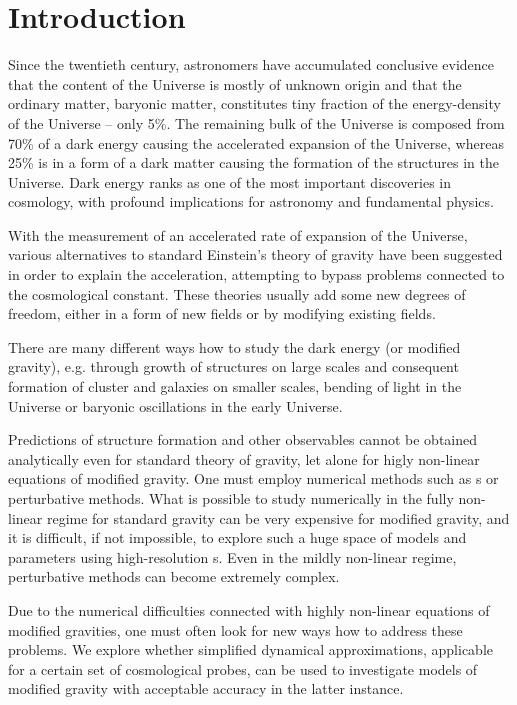 \chapter*{Introduction}
Since the twentieth century, astronomers have accumulated conclusive evidence that the content of the Universe is mostly of unknown origin and that the ordinary matter, baryonic matter, constitutes tiny fraction of the energy-density of the Universe -- only 5\%. The remaining bulk of the Universe is composed from 70\% of a dark energy causing the accelerated expansion of the Universe, whereas 25\% is in a form of a dark matter causing the formation of the structures in the Universe. Dark energy ranks as one of the most important discoveries in cosmology, with profound implications for astronomy and fundamental physics.

With the measurement of an accelerated rate of expansion of the Universe, various alternatives to standard Einstein's theory of gravity have been suggested in order to explain the acceleration, attempting to bypass problems connected to the cosmological constant. These theories usually add some new degrees of freedom, either in a form of new fields or by modifying existing fields.

There are many different ways how to study the dark energy (or modified gravity), e.g. through growth of structures on large scales and consequent formation of cluster and galaxies on smaller scales, bending of light in the Universe or baryonic oscillations in the early Universe.

Predictions of structure formation and other observables cannot be obtained analytically even for standard theory of gravity, let alone for higly non-linear equations of modified gravity. One must employ numerical methods such as \nbodysim s or perturbative methods. What is possible to study numerically in the fully non-linear regime for standard gravity can be very expensive for modified gravity, and it is difficult, if not impossible, to explore such a huge space of models and parameters using high-resolution \nbodysim s. Even in the mildly non-linear regime, perturbative methods can become extremely complex.

Due to the numerical difficulties connected with highly non-linear equations of modified gravities, one must often look for new ways how to address these problems. We explore whether simplified dynamical approximations, applicable for a certain set of cosmological probes, can be used to investigate models of modified gravity with acceptable accuracy in the latter instance.

